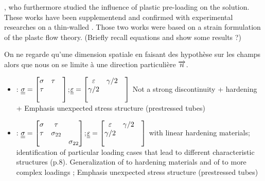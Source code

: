 , who furthermore studied the influence of plastic pre-loading on the solution.
These works have been supplementend and confirmed with experimental researches on a thin-walled \cite{Clifton_exp}.
Those two works were based on a strain formulation of the plastc flow theory. (Briefly recall equations and show some results ?)

On ne regarde qu'une dimension spatiale en faisant des hypothèse sur les champs alors que nous on se limite à une direction particulière ${\overrightarrow{n}}$.
\begin{itemize}
\item \cite{Clifton}: ${\underline{\underline{\sigma}}}=\left[\begin{matrix}\sigma & \tau & \\ \tau & & \\ & & \end{matrix}\right]$;${\underline{\underline{\varepsilon}}}=\left[\begin{matrix}\varepsilon & \gamma/2 & \\ \gamma/2 &  & \\ & & \end{matrix}\right]$ Not a strong discontinuity + hardening + Emphasis unexpected stress structure (prestressed tubes)
\item \cite{Ting68}: ${\underline{\underline{\sigma}}}=\left[\begin{matrix}\sigma & \tau & \\ \tau & \sigma_{22} & \\ & & \sigma_{22}\end{matrix}\right]$;${\underline{\underline{\varepsilon}}}=\left[\begin{matrix}\varepsilon & \gamma/2 & \\ \gamma/2 &  & \\ & & \end{matrix}\right]$ with linear hardening materials; identification of particular loading cases that lead to different characteristic structures (p.8). Generalization of \cite{Bleich} to hardening materials and of \cite{Clifton} to more complex loadings ; Emphasis unexpected stress structure (prestressed tubes)

\end{itemize}
